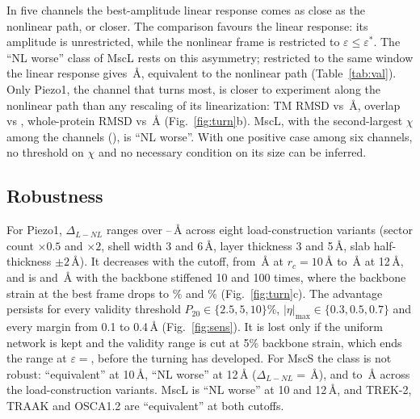 \documentclass[preprint,12pt,a4paper]{elsarticle}
\newcommand{\eps}{\varepsilon}
\begin{document}
In five channels the best-amplitude linear response comes as close as the nonlinear path, or closer. The comparison favours the linear response: its amplitude is unrestricted, while the nonlinear frame is restricted to $\eps\le\eps^*$. The ``NL worse'' class of MscL rests on this asymmetry; restricted to the same window the linear response gives \,\AA, equivalent to the nonlinear path (Table~\ref{tab:val}). Only Piezo1, the channel that turns most, is closer to experiment along the nonlinear path than any rescaling of its linearization: TM RMSD  vs \,\AA, overlap  vs , whole-protein RMSD  vs \,\AA{} (Fig.~\ref{fig:turn}b). MscL, with the second-largest $\chi$ among the channels (), is ``NL worse''. With one positive case among six channels, no threshold on $\chi$ and no necessary condition on its size can be inferred.

\subsection{Robustness}
\label{sec:robust}
For Piezo1, $\Delta_{L-NL}$ ranges over --\,\AA{} across eight load-construction variants (sector count $\times0.5$ and $\times2$, shell width 3 and 6\,\AA, layer thickness 3 and 5\,\AA, slab half-thickness $\pm2$\,\AA). It decreases with the cutoff, from \,\AA{} at $r_c=10$\,\AA{} to \,\AA{} at 12\,\AA, and is  and \,\AA{} with the backbone stiffened 10 and 100 times, where the backbone strain at the best frame drops to \% and \% (Fig.~\ref{fig:turn}c). The advantage persists for every validity threshold $P_{20}\in\{2.5,5,10\}\%$, $|\eta|_{\max}\in\{0.3,0.5,0.7\}$ and every margin from 0.1 to 0.4\,\AA{} (Fig.~\ref{fig:sens}). It is lost only if the uniform network is kept and the validity range is cut at 5\% backbone strain, which ends the range at $\eps=$, before the turning has developed. For MscS the class is not robust: ``equivalent'' at 10\,\AA, ``NL worse'' at 12\,\AA{} ($\Delta_{L-NL}=$\,\AA), and  to \,\AA{} across the load-construction variants. MscL is ``NL worse'' at 10 and 12\,\AA, and TREK-2, TRAAK and OSCA1.2 are ``equivalent'' at both cutoffs.
\end{document}
